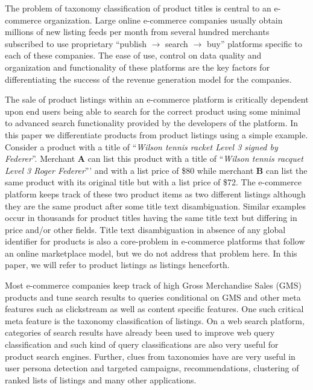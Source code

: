 \vspace{-0.2cm}

The problem of taxonomy classification of product titles is central to an e-commerce organization. 
Large online e-commerce companies usually obtain millions of new listing feeds per month from several hundred merchants subscribed to use proprietary ``publish $\rightarrow$ search $\rightarrow$ buy'' platforms specific to each of these companies. 
The ease of use, control on data quality and organization and functionality of these platforms are the key factors for differentiating the success of the revenue generation model for the companies.

The sale of product listings within an e-commerce platform is critically dependent upon end users being able to search for the correct product using some minimal to advanced search functionality provided by the developers of the platform. 
In this paper we differentiate products from product listings using a simple example. 
Consider a product with a title of ``\textit{Wilson tennis racket Level 3 signed by Federer}''. 
Merchant \textbf{A} can list this product with a title of ``\textit{Wilson tennis racquet Level 3 Roger Federer}''' and with a list price of \$80 while merchant \textbf{B} can list the same product with its original title but with a list price of \$72.
The e-commerce platform keeps track of these two product items as two different listings although they are the same product after some title text disambiguation.
Similar examples occur in thousands for product titles having the same title text but differing in price and/or other fields.
Title text disambiguation in absence of any global identifier for products is also a core-problem in e-commerce platforms that follow an online marketplace model, but we do not address that problem here.
In this paper, we will refer to product listings as listings henceforth. 

Most e-commerce companies keep track of high Gross Merchandise Sales (GMS) products and tune search results to queries conditional on GMS and other meta features such as clickstream as well as  content specific features.
One such critical meta feature is the taxonomy classification of listings.
On a web search platform, categories of search results have already been used to improve web query classification \cite{Ganti10} and such kind of query classifications are also very useful for product search engines.
Further, clues from taxonomies have are very useful in user persona detection and targeted campaigns, recommendations, clustering of  ranked lists of listings and many other applications.

